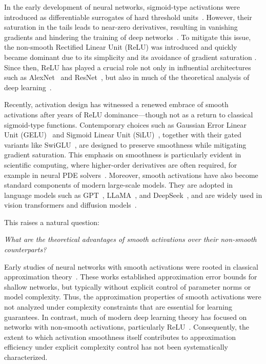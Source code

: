 \documentclass[11pt]{article}
\begin{document}
In the early development of neural networks, sigmoid-type activations were introduced as differentiable surrogates of hard threshold units~\citep{mcculloch1943logical,rumelhart1986learning}.
However, their saturation in the tails leads to near-zero derivatives, resulting in vanishing gradients and hindering the training of deep networks~\citep{hochreiter1991untersuchungen,bengio1994learning}. 
To mitigate this issue, the non-smooth Rectified Linear Unit (ReLU) was introduced and quickly became dominant due to its simplicity and its avoidance of gradient saturation \citep{nair2010rectified,glorot2011deep}. Since then, ReLU has played a crucial role not only in influential architectures such as AlexNet~\citep{krizhevsky2012imagenet} and ResNet~\citep{he2016deep}, but also in much of the theoretical analysis of deep learning~\citep{schmidt2020nonparametric,weinan2019barron}.

Recently,  activation design has witnessed a renewed embrace of smooth activations after years of ReLU dominance---though not as a return to classical sigmoid-type functions. Contemporary choices such as Gaussian Error Linear Unit (GELU)~\citep{hendrycks2016gaussian} and Sigmoid Linear Unit (SiLU)~\citep{ramachandran2017searching, elfwing2018sigmoid}, together with their gated variants like SwiGLU~\citep{shazeer2020glu}, are designed to preserve smoothness while mitigating gradient saturation.
This emphasis on smoothness is particularly evident in scientific computing, where higher-order derivatives  are often required, for example in neural PDE solvers~\citep{raissi2019physics,weinan2018deep,lu2021learning}. Moreover, smooth activations have also become standard components of modern large-scale models. They are adopted in language models such as GPT~\citep{radford2019language}, LLaMA~\citep{grattafiori2024llama3herdmodels}, and DeepSeek~\citep{liu2024deepseek}, and are widely used in vision transformers and diffusion models~\citep{dosovitskiy2021image,ho2020denoising}.

This raises a natural question:
\begin{center}
{\it What are the theoretical advantages of smooth activations over their non-smooth counterparts?}
\end{center}
Early studies of neural networks with smooth activations were rooted in classical approximation theory~\citep{devore1989optimal,mhaskar1996neural,pinkus1999approximation}. These works established approximation error bounds for shallow networks, but typically without explicit control of parameter norms or model complexity. Thus, the approximation properties of smooth activations were not analyzed under complexity constraints that are essential for learning guarantees.
In contrast, much of modern deep learning theory has focused on networks with non-smooth activations, particularly ReLU~\citep{yarotsky2017error,schmidt2020nonparametric}. Consequently, the extent to which activation smoothness itself contributes to approximation efficiency under explicit complexity control has not been systematically characterized.
\end{document}
